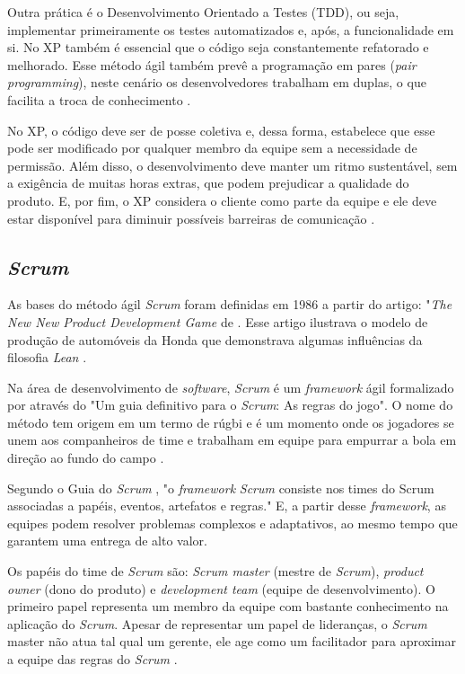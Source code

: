 \documentclass[
    12pt,       %
    openright,      %
    twoside,      %
    a4paper,      %
    english,      %
    french,       %
    spanish,      %
    brazil,       %
    ]{abntex2}
\begin{document}
Outra prática é o Desenvolvimento Orientado a Testes (TDD), ou seja, implementar primeiramente os testes automatizados e, após, a funcionalidade em si. No XP também é essencial que o código seja constantemente refatorado e melhorado. Esse método ágil também prevê a programação em pares (\textit{pair programming}), neste cenário os desenvolvedores trabalham em duplas, o que facilita a troca de conhecimento \cite{SOMMERVILLE:2011}.

No XP, o código deve ser de posse coletiva e, dessa forma, estabelece que esse pode ser modificado por qualquer membro da equipe sem a necessidade de permissão. Além disso, o desenvolvimento deve manter um ritmo sustentável, sem a exigência de muitas horas extras, que podem prejudicar a qualidade do produto. E, por fim, o XP considera o cliente como parte da equipe e ele deve estar disponível para diminuir possíveis barreiras de comunicação \cite{WAZLAWICK:2013}.

\subsection{\textit{Scrum}}
As bases do método ágil \textit{Scrum} foram definidas em 1986 a partir do artigo: "\textit{The New New Product Development Game} de . Esse artigo ilustrava o modelo de produção de automóveis da Honda que demonstrava algumas influências da filosofia \textit{Lean} \cite{WAZLAWICK:2013}.

Na área de desenvolvimento de \textit{software}, \textit{Scrum} é um \textit{framework} ágil formalizado por  através do "Um guia definitivo para o \textit{Scrum}: As regras do jogo". O nome do método tem origem em um termo de rúgbi e é um momento onde os jogadores se unem aos companheiros de time e trabalham em equipe para empurrar a bola em direção ao fundo do campo \cite{PRESSMAN:2011}. 

Segundo o Guia do \textit{Scrum} \cite{Sutherland:2013}, "o \textit{framework} \textit{Scrum} consiste nos times do Scrum associadas a papéis, eventos, artefatos e
regras." E, a partir desse \textit{framework}, as equipes podem resolver problemas complexos e adaptativos, ao mesmo tempo que garantem uma entrega de alto valor. 

Os papéis do time de \textit{Scrum} são: \textit{Scrum master} (mestre de \textit{Scrum}), \textit{product owner} (dono do produto) e \textit{development team} (equipe de desenvolvimento). O primeiro papel representa um membro da equipe com bastante conhecimento na aplicação do \textit{Scrum}. Apesar de representar um papel de lideranças, o \textit{Scrum} master não atua tal qual um gerente, ele age como um facilitador para aproximar a equipe das regras do \textit{Scrum} \cite{WAZLAWICK:2013}.
\end{document}
